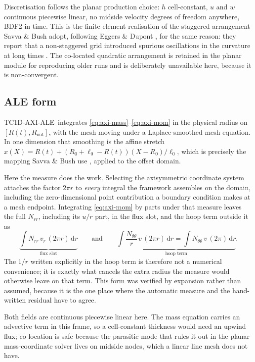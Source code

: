 \documentclass[11pt,a4paper]{article}
\newcommand{\ALE}{\textsf{TC1D-AXI-ALE}}
\begin{document}
Discretisation follows the planar production choice: $h$ cell-constant, $u$ and
$w$ continuous piecewise linear, no midside velocity degrees of freedom
anywhere, BDF2 in time. This is the finite-element realisation of the staggered
arrangement Savva \& Bush adopt, following Eggers \& Dupont
\cite{eggers1994}, for the same reason: they report that a non-staggered grid
introduced spurious oscillations in the curvature at long times
\cite{savva2009}. The co-located quadratic arrangement is retained in the
planar module for reproducing older runs and is deliberately unavailable here,
because it is non-convergent.

\subsection{ALE form}
\label{sec:aleform}

\ALE\ integrates \eqref{eq:axi-mass}--\eqref{eq:axi-mom} in the physical radius
on $[R(t), R_{\mathrm{out}}]$, with the mesh moving under a Laplace-smoothed
mesh equation. In one dimension that smoothing is the affine stretch
$x(X) = R(t) + \left(R_{0}+\ell_{0}-R(t)\right)(X-R_{0})/\ell_{0}$, which is
precisely the mapping Savva \& Bush use \cite{savva2009}, applied to the offset
domain.

Here the measure does the work. Selecting the axisymmetric coordinate system
attaches the factor $2\pi r$ to \emph{every} integral the framework assembles on
the domain, including the zero-dimensional point contribution a boundary
condition makes at a mesh endpoint. Integrating \eqref{eq:axi-mom} by parts
under that measure leaves the full $N_{rr}$, including its $u/r$ part, in the
flux slot, and the hoop term outside it as
%
\begin{equation}
  \underbrace{\int N_{rr}\,v_{r}\,(2\pi r)\,\mathrm{d}r}_{\text{flux slot}}
  \qquad\text{and}\qquad
  \underbrace{\int \frac{N_{\theta\theta}}{r}\,v\,(2\pi r)\,\mathrm{d}r
    = \int N_{\theta\theta}\,v\,(2\pi)\,\mathrm{d}r}_{\text{hoop term}} .
  \label{eq:aleweak}
\end{equation}
%
The $1/r$ written explicitly in the hoop term is therefore not a numerical
convenience; it is exactly what cancels the extra radius the measure would
otherwise leave on that term. This form was verified by expansion rather than
assumed, because it is the one place where the automatic measure and the
hand-written residual have to agree.

Both fields are continuous piecewise linear here. The mass equation carries an
advective term in this frame, so a cell-constant thickness would need an upwind
flux; co-location is safe because the parasitic mode that rules it out in the
planar mass-coordinate solver lives on midside nodes, which a linear line mesh
does not have.
\end{document}
